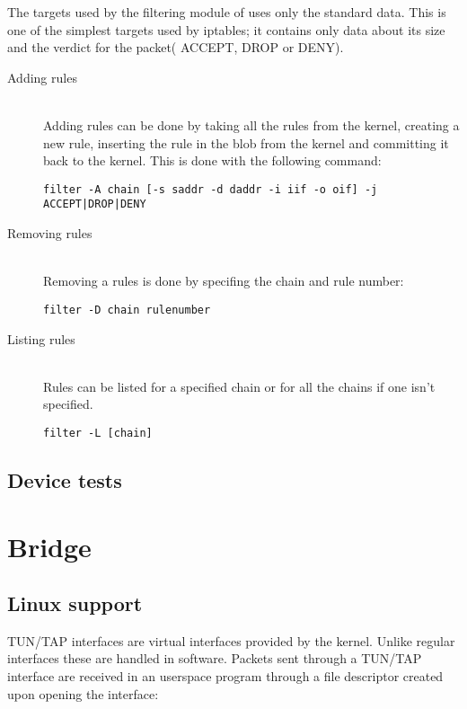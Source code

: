 The targets used by the filtering module of \text{\project} uses only the standard data. This is one of the simplest targets
used by iptables; it contains only data about its size and the verdict for the packet( ACCEPT, DROP or DENY).

\begin{description}
\item[Adding rules] \hfill \\
Adding rules can be done by taking all the rules from the kernel, creating a 
new rule, inserting the rule in the blob from the kernel and committing it back
to the kernel. This is done with the following command:
\lstset{language=zsh,caption=Adding a rule,label=lst:saddrule}
\begin{lstlisting}
filter -A chain [-s saddr -d daddr -i iif -o oif] -j ACCEPT|DROP|DENY
\end{lstlisting}
\item[Removing rules] \hfill \\
Removing a rules is done by specifing the chain and rule number:
\lstset{language=zsh,caption=Deleting a rule,label=lst:sdelrule}
\begin{lstlisting}
filter -D chain rulenumber
\end{lstlisting}
\item[Listing rules] \hfill \\
Rules can be listed for a specified chain or for all the chains if one isn't specified.
\lstset{language=zsh,caption=List rules,label=lst:slstrule}
\begin{lstlisting}
filter -L [chain]
\end{lstlisting}
\end{description}

\subsection{Device tests}
\label{sub-sec:firewall-tests}

\section{Bridge}

\subsection{Linux support}
\label{sub-sec:bridge-lin}

TUN/TAP interfaces are virtual interfaces provided by the kernel. Unlike regular interfaces
these are handled in software. Packets sent through a TUN/TAP interface are received in
an userspace program through a file descriptor created upon opening the interface: 

